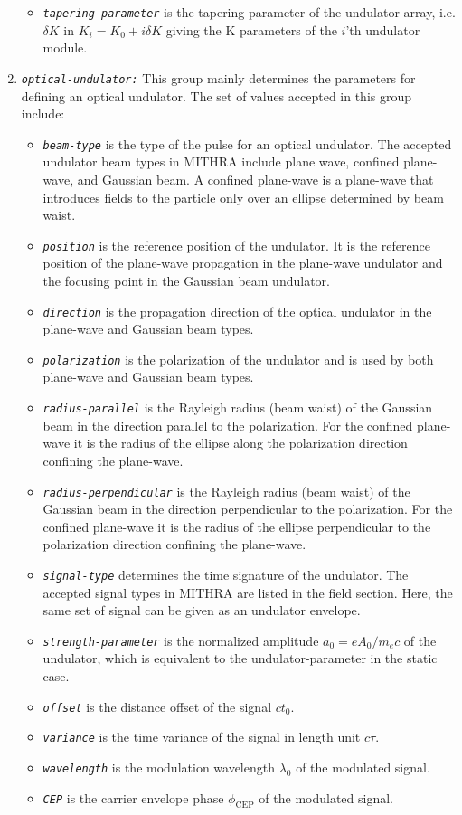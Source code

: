 \begin{enumerate}
\begin{itemize}
    \item {\tt \small \em tapering-parameter} is the tapering parameter of the undulator array, i.e. $\delta K$ in $K_i=K_0+i \delta K$ giving the K parameters of the $i$'th undulator module. 
\end{itemize}
%
\item {\tt \small \em optical-undulator:} This group mainly determines the parameters for defining an optical undulator. The set of values accepted in this group include:
%
\begin{itemize}
	\item {\tt \small \em beam-type} is the type of the pulse for an optical undulator. The accepted undulator beam types in MITHRA include plane wave, confined plane-wave, and Gaussian beam. A confined plane-wave is a plane-wave that introduces fields to the particle only over an ellipse determined by beam waist.
	\item {\tt \small \em position} is the reference position of the undulator. It is the reference position of the plane-wave propagation in the plane-wave undulator and the focusing point in the Gaussian beam undulator.
	\item {\tt \small \em direction} is the propagation direction of the optical undulator in the plane-wave and Gaussian beam types.
	\item {\tt \small \em polarization} is the polarization of the undulator and is used by both plane-wave and Gaussian beam types.
	\item {\tt \small \em radius-parallel} is the Rayleigh radius (beam waist) of the Gaussian beam in the direction parallel to the polarization. For the confined plane-wave it is the radius of the ellipse along the polarization direction confining the plane-wave.
	\item {\tt \small \em radius-perpendicular} is the Rayleigh radius (beam waist) of the Gaussian beam in the direction perpendicular to the polarization. For the confined plane-wave it is the radius of the ellipse perpendicular to the polarization direction confining the plane-wave.
	\item {\tt \small \em signal-type} determines the time signature of the undulator. The accepted signal types in MITHRA are listed in the field section. Here, the same set of signal can be given as an undulator envelope.
	\item {\tt \small \em strength-parameter} is the normalized amplitude $a_0 = e A_0 / m_ec $ of the undulator, which is equivalent to the undulator-parameter in the static case.
	\item {\tt \small \em offset} is the distance offset of the signal $ct_0$.
	\item {\tt \small \em variance} is the time variance of the signal in length unit $c\tau$.
	\item {\tt \small \em wavelength} is the modulation wavelength $\lambda_0$ of the modulated signal.
	\item {\tt \small \em CEP} is the carrier envelope phase $\phi_{\mathrm{CEP}}$ of the modulated signal.
\end{itemize}
%
\end{enumerate}

